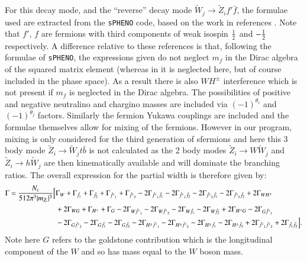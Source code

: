 \documentclass[final,3p,times]{elsarticle}
\begin{document}
For this decay mode, and the ``reverse'' decay mode $\tilde{W}_j \rightarrow
\tilde{Z}_i f' \bar{f}$, the formulae used are extracted from the {\tt sPHENO}
code, based on the work in references \cite{Baer:1998, TataBaer}. Note that
$f'$, $f$ are fermions with third components of weak isospin $1 \over 2$ and
$-{1 \over 2}$ respectively. A difference relative to these references is
that, following the formulae of {\tt sPHENO}, the expressions given do not
neglect $m_f$ in the Dirac algebra of the squared matrix element (whereas in
\cite{Baer:1998, TataBaer} it is neglected here, but of course included in the
phase space). As a result there is also $WH^{\pm}$ interference which is not
present if $m_f$ is neglected in the Dirac algebra. The possibilities of
positive and negative neutralino and chargino masses are included via
$(-1)^{\theta_{i}}$ and $(-1)^{\theta_{j}}$ factors. Similarly the fermion
Yukawa couplings are included and the formulae themselves allow for mixing of
the fermions. However in our program, mixing is only considered for the third
generation of sfermions and here this 3 body mode $\tilde{Z}_i \rightarrow
\tilde{W}_j t \bar{b}$ is not calculated as the 2 body modes $\tilde{Z}_i
\rightarrow W \tilde{W}_j$ and $\tilde{Z}_i \rightarrow h \tilde{W}_j$ are
then kinematically available and will dominate the branching ratios. 
The overall expression for the partial width is therefore given by:
\begin{equation} \label{neutchff}
\begin{aligned}
\Gamma = {N_{c} \over 512 \pi^3 |m_{Z_{i}}|^3}\Big[ & \Gamma_W + \Gamma_{\tilde{f}_1} + \Gamma_{\tilde{f}_2} + \Gamma_{\tilde{f'}_1} + \Gamma_{\tilde{f'}_2} -2\Gamma_{\tilde{f'}_{1} \tilde{f}_1} - 2\Gamma_{\tilde{f'}_{1}\tilde{f}_2} - 2\Gamma_{\tilde{f'}_{2}\tilde{f}_1} - 2\Gamma_{\tilde{f'}_{2}\tilde{f}_2} + 2\Gamma_{W H^{\pm}} \\ & + 2\Gamma_{W G} + \Gamma_{H^{\pm}} + \Gamma_{G} - 2\Gamma_{W \tilde{f'}_1} - 2\Gamma_{W \tilde{f'}_2} - 2\Gamma_{W \tilde{f}_1} - 2\Gamma_{W \tilde{f}_2} + 2\Gamma_{H^{\pm} G} - 2\Gamma_{G \tilde{f'}_1}  \\ & - 2\Gamma_{G \tilde{f'}_2} - 2\Gamma_{G \tilde{f}_1} - 2\Gamma_{G \tilde{f}_2} - 2\Gamma_{H^{\pm} \tilde{f'}_1} - 2\Gamma_{H^{\pm} \tilde{f'}_2} - 2\Gamma_{H^{\pm} \tilde{f}_1} - 2\Gamma_{H^{\pm} \tilde{f}_2} + 2\Gamma_{\tilde{f'}_1 \tilde{f'}_2} + 2\Gamma_{\tilde{f}_1 \tilde{f}_2} \Big].
\end{aligned}
\end{equation}
Note here $G$ refers to the goldstone contribution which is the longitudinal component of the $W$ and so has mass equal to the $W$ boson mass.
\end{document}
